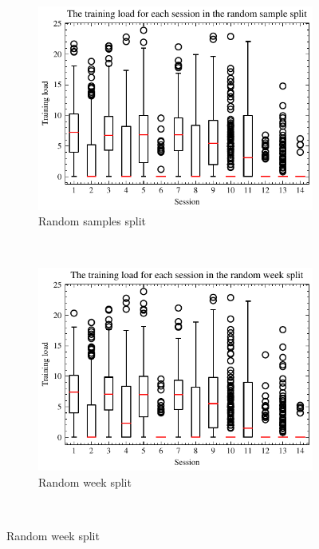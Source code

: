 \begin{figure}[ht]
    \centering
    \begin{subfigure}[t]{0.48\textwidth}
        \centering
        \includegraphics[width=\textwidth]{chapters/figures/data_exploration/random_sample_session_boxplot.pdf}
        \captionsetup{width=.9\linewidth}
        \caption{Random samples split}
    \end{subfigure}%
    ~ 
    \begin{subfigure}[t]{0.48\textwidth}
        \centering
        \includegraphics[width=\textwidth]{chapters/figures/data_exploration/random_week_session_boxplot.pdf}
        \captionsetup{width=.9\linewidth}
        \caption{Random week split}
    \end{subfigure}\\[1ex]

\end{figure}
